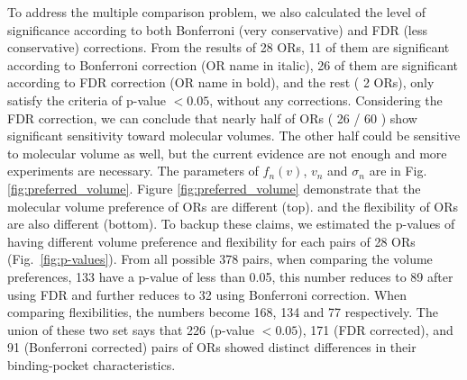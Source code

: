 \documentclass[11pt]{paper} %
\newcommand{\numberofreceptors}{ 28 }
\newcommand{\bonferroni}{ 11 }
\newcommand{\fdr}{ 26 }
\newcommand{\nocorrection}{ 2 }
\begin{document}
To address the multiple comparison problem, 
we also calculated the level of significance according to both Bonferroni (very conservative) and FDR (less conservative) corrections. 
From the results of \numberofreceptors ORs, 
\bonferroni of them are significant according to Bonferroni correction (OR name in italic), 
\fdr of them are significant according to FDR correction 
(OR name in bold), 
and the rest (\nocorrection ORs), 
only satisfy the criteria of  p-value $<0.05$, without any corrections.
Considering the FDR correction, 
we can conclude that nearly half of ORs (\fdr / 60 ) show significant sensitivity toward molecular volumes. 
The other half could be sensitive to molecular volume as well, but the current evidence are not enough and
more experiments are necessary.
The parameters of $f_n(v)$, $v_n$ and $\sigma_n$ are in Fig. \ref{fig:preferred_volume}.
Figure \ref{fig:preferred_volume} demonstrate that the molecular volume preference of ORs are different (top). 
and the flexibility of ORs are also different (bottom).
To backup these claims, 
we estimated the p-values of having different volume preference and flexibility for each pairs of \numberofreceptors ORs
(Fig.~\ref{fig:p-values}). 
From all possible 378 pairs, 
when comparing the volume preferences, 
133 have a p-value of less than 0.05, 
this number reduces to 89 after using FDR and further reduces to 32 using Bonferroni correction.
When comparing flexibilities, 
the numbers become 168, 134 and 77 respectively. 
The union of these two set says that 226 (p-value $<0.05$), 171 (FDR corrected), and 91 (Bonferroni corrected) pairs of ORs showed distinct differences in their binding-pocket characteristics.
\end{document}
